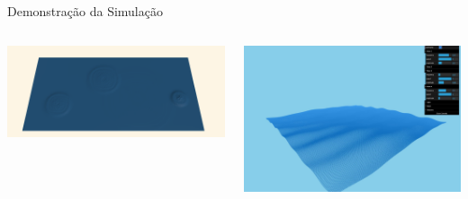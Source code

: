 \documentclass[aspectratio=169,xcolor=table]{beamer}
\begin{document}
\begin{frame}{Demonstração da Simulação}
    \begin{columns}
        \centering
        \includegraphics[width=\textwidth]{imgs/wave.png}
        
        \centering
        \includegraphics[width=\textwidth]{imgs/wave-2.jpeg}
    \end{columns}
\end{frame}


\end{document}
